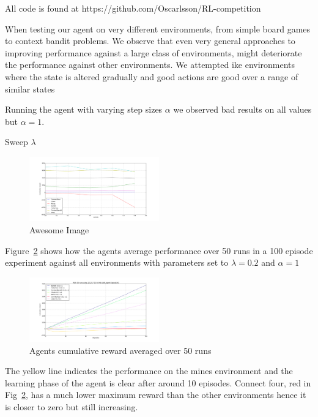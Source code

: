 All code is found at https://github.com/Oscarlsson/RL-competition

When testing our agent on very different environments, from simple board games to context bandit problems. We observe that even very general approaches to improving performance against a large class of environments, might deteriorate the performance against other environments. We attempted ike environments where the state is altered gradually and good actions are good over a range of similar states

Running the agent with varying step sizes $\alpha$ we observed bad results on all values but $\alpha=1$.


Sweep $\lambda$
\begin{figure}[h]
    \centering
    \includegraphics[width=0.5\textwidth]{../data/lambdasweepplot.png}
    \caption{Awesome Image}
    \label{fig:awesome_image}
\end{figure}


Figure~\ref{fig:cumreward} shows how the agents average performance over 50 runs in a 100 episode experiment against all environments with parameters set to $\lambda = 0.2$ and $\alpha = 1$

\begin{figure}[h!]
    \centering
    \includegraphics[width=0.5\textwidth]{../data/100episodes_50runs.png}
    \caption{Agents cumulative reward averaged over 50 runs}
    \label{fig:cumreward}
\end{figure}

The yellow line indicates the performance on the mines environment and the learning phase of the agent is clear after around 10 episodes. Connect four, red in Fig~\ref{fig:cumreward}, has a much lower maximum reward than the other environments hence it is closer to zero but still increasing.
